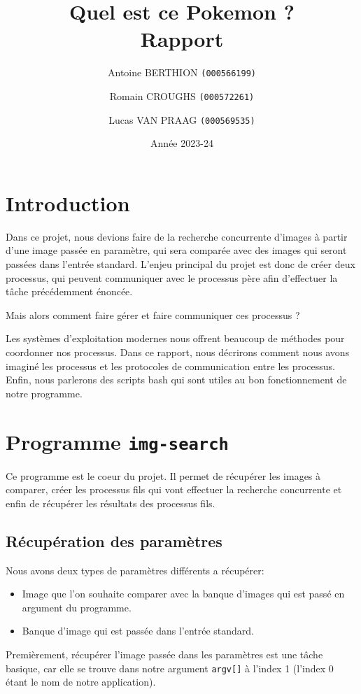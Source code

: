 \documentclass[french]{article}
\title{Quel est ce Pokemon ? \\ Rapport}
\date{Année 2023-24}
\author{Antoine BERTHION \texttt{(000566199)} \and Romain CROUGHS \texttt{(000572261)} \and Lucas VAN PRAAG \texttt{(000569535)}}
\begin{document}
\maketitle

\section{Introduction}
Dans ce projet, nous devions faire de la recherche concurrente d'images à partir d'une image passée en paramètre, qui sera comparée avec
des images qui seront passées dans l'entrée standard. L'enjeu principal du projet est donc de créer deux processus, qui peuvent communiquer
avec le processus père afin d'effectuer la tâche précédemment énoncée.

Mais alors comment faire gérer et faire communiquer ces processus ?

Les systèmes d'exploitation modernes nous offrent beaucoup de méthodes pour coordonner nos processus. Dans ce rapport, nous décrirons comment
nous avons imaginé les processus et les protocoles de communication entre les processus. Enfin, nous parlerons des scripts bash qui sont utiles
au bon fonctionnement de notre programme.

\section{Programme \texttt{img-search}}
Ce programme est le coeur du projet. Il permet de récupérer les images à comparer, créer les processus fils qui vont effectuer la recherche concurrente
et enfin de récupérer les résultats des processus fils. 

\subsection{Récupération des paramètres}
\noindent Nous avons deux types de paramètres différents a récupérer:

\begin{itemize}
  \item Image que l'on souhaite comparer avec la banque d'images qui est passé en argument du programme. 
  \item Banque d'image qui est passée dans l'entrée standard.
\end{itemize}

Premièrement, récupérer l'image passée dans les paramètres est une tâche basique, car elle se trouve dans notre argument \texttt{argv[]} 
à l'index 1 (l'index 0 étant le nom de notre application).
\end{document}
